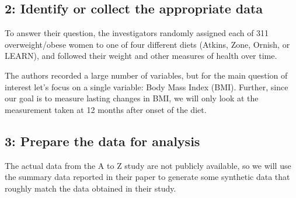 \documentclass[]{book}
\theoremstyle{definition}
\theoremstyle{definition}
\theoremstyle{definition}
\theoremstyle{remark}
\begin{document}
\subsection{2: Identify or collect the appropriate
data}\label{identify-or-collect-the-appropriate-data}

To answer their question, the investigators randomly assigned each of
311 overweight/obese women to one of four different diets (Atkins, Zone,
Ornish, or LEARN), and followed their weight and other measures of
health over time.

The authors recorded a large number of variables, but for the main
question of interest let's focus on a single variable: Body Mass Index
(BMI). Further, since our goal is to measure lasting changes in BMI, we
will only look at the measurement taken at 12 months after onset of the
diet.

\subsection{3: Prepare the data for
analysis}\label{prepare-the-data-for-analysis}

The actual data from the A to Z study are not publicly available, so we
will use the summary data reported in their paper to generate some
synthetic data that roughly match the data obtained in their study.
\end{document}
